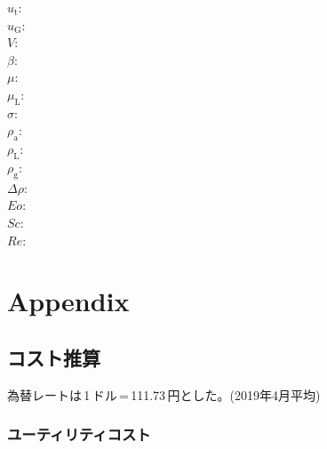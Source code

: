 \documentclass[a4j]{jsreport}
\begin{document}
\begin{multicols}{2}
\begin{flushleft}
    $u_{\mathrm{t}}$:\\
    $u_{\mathrm{G}}$:\\
    $V$:\\
    $\beta$:\\
    $\mu$:\\
    $\mu_{\mathrm{L}}$:\\
    $\sigma$:\\
    $\rho_{\mathrm{a}}$:\\
    $\rho_{\mathrm{L}}$:\\
    $\rho_{\mathrm{g}}$:\\
    $\Delta\rho$:\\
    $Eo$:\\
    $Sc$:\\
    $Re$:
\end{flushleft}
\end{multicols}


\chapter*{Appendix}

\section*{コスト推算}

為替レートは\,1\,ドル\,=\,111.73\,円とした。(2019年4月平均)
\subsection*{ユーティリティコスト}
\end{document}
